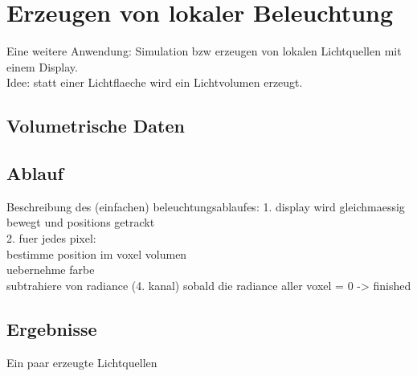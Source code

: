 \chapter{Erzeugen von lokaler Beleuchtung}
\label{chap:lokale_beleuchtung}

  Eine weitere Anwendung: Simulation bzw erzeugen von lokalen Lichtquellen mit einem Display.\\
  Idee: statt einer Lichtflaeche wird ein Lichtvolumen erzeugt. \\

 \section{Volumetrische Daten}
 
 \section{Ablauf}
  Beschreibung des (einfachen) beleuchtungsablaufes:
    1. display wird gleichmaessig bewegt und positions getrackt\\
    2. fuer jedes pixel:\\
       bestimme position im voxel volumen\\
       uebernehme farbe\\
       subtrahiere von radiance (4. kanal)
       sobald die radiance aller voxel = 0 -> finished

 \section{Ergebnisse}
  Ein paar erzeugte Lichtquellen


  

